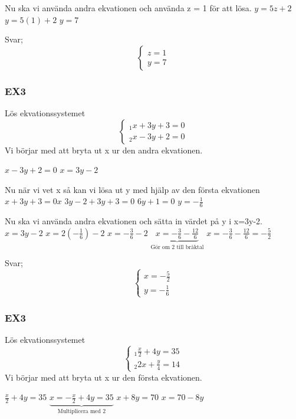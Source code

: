 \documentclass[a4paper,10pt]{article}
\begin{document}
\begin{flushleft}
Nu ska vi använda andra ekvationen och använda z = 1 för att lösa.
$y = 5z+2$\newline
$y = 5(1)+2$\newline
$y = 7$\newline

Svar;
\[
\begin{cases}
z = 1\\
y = 7
\end{cases}
\]

\subsubsection{EX3}
Lös ekvationssystemet
\[
\begin{cases}
_1  x+3y+3=0\\
_2  x-3y+2=0
\end{cases}
\]
Vi börjar med att bryta ut x ur den andra ekvationen.

$x-3y+2=0$\newline
$x=3y-2$

Nu när vi vet x så kan vi lösa ut y med hjälp av den första ekvationen
$x+3y+3=0x$\newline
$3y-2+3y+3=0$\newline
$6y+1=0$\newline
$y = -\frac{1}{6}$

Nu ska vi använda andra ekvationen och sätta in värdet på y i x=3y-2.
$x=3y-2$\newline
$x=2(-\frac{1}{6})-2$\newline
$x=-\frac{3}{6}-2$
$\underbrace{x = -\frac{3}{6}-\frac{12}{6}}_{\text{Gör om 2 till bråktal}}$\newline
$x = -\frac{3}{6}-\frac{12}{6} = -\frac{5}{2}$\newline

Svar;
\[
\begin{cases}
x = -\frac{5}{2}\\
y = -\frac{1}{6}
\end{cases}
\]

\subsubsection{EX3}
Lös ekvationssystemet
\[
\begin{cases}
_1 \frac{x}{2}+4y=35\\
_2 2x+\frac{y}{4}=14
\end{cases}
\]
Vi börjar med att bryta ut x ur den första ekvationen.

$\frac{x}{2}+4y=35$\newline
$\underbrace{x = -\frac{x}{2}+4y=35}_{\text{Multiplicera med 2}}$\newline
$x+8y=70$
$x=70-8y$


\end{flushleft}
\end{document}
